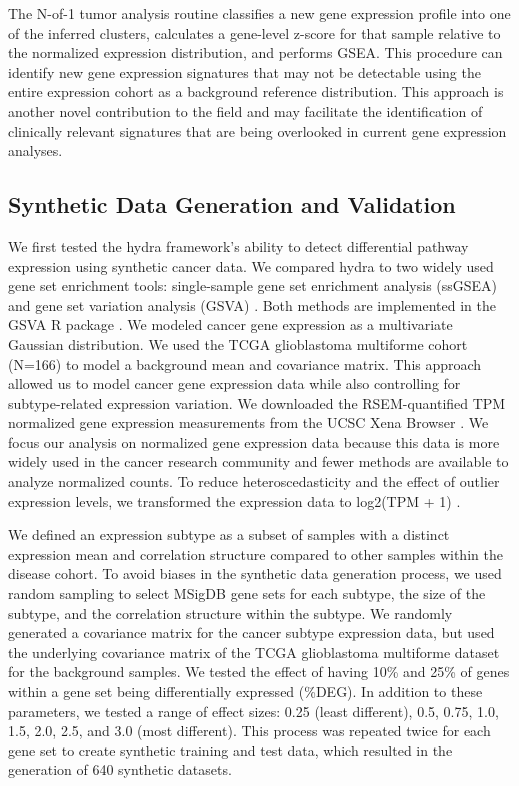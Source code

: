 \documentclass[10pt,letterpaper]{article}
\begin{document}
The N-of-1 tumor analysis routine classifies a new gene expression profile into one of the inferred clusters, calculates a gene-level z-score for that sample relative to the normalized expression distribution, and performs GSEA. This procedure can identify new gene expression signatures that may not be detectable using the entire expression cohort as a background reference distribution. This approach is another novel contribution to the field and may facilitate the identification of clinically relevant signatures that are being overlooked in current gene expression analyses.

\subsection*{Synthetic Data Generation and Validation}

We first tested the hydra framework’s ability to detect differential pathway expression using synthetic cancer data. We compared hydra to two widely used gene set enrichment tools: single-sample gene set enrichment analysis (ssGSEA) and gene set variation analysis (GSVA) \cite{barbieSystematicRNAInterference2009, hanzelmannGSVAGeneSet2013, tarcaComparisonGeneSet2013}. Both methods are implemented in the GSVA R package \cite{hanzelmannGSVAGeneSet2013}. We modeled cancer gene expression as a multivariate Gaussian distribution. We used the TCGA glioblastoma multiforme cohort (N=166) to model a background mean and covariance matrix. This approach allowed us to model cancer gene expression data while also controlling for subtype-related expression variation. We downloaded the RSEM-quantified TPM normalized gene expression measurements from the UCSC Xena Browser \cite{goldmanUCSCXenaPlatform2018}. We focus our analysis on normalized gene expression data because this data is more widely used in the cancer research community and fewer methods are available to analyze normalized counts. To reduce heteroscedasticity and the effect of outlier expression levels, we transformed the expression data to log2(TPM + 1) \cite{zwienerTransformingRNASeqData2014}. 

We defined an expression subtype as a subset of samples with a distinct expression mean and correlation structure compared to other samples within the disease cohort. To avoid biases in the synthetic data generation process, we used random sampling to select MSigDB gene sets for each subtype, the size of the subtype, and the correlation structure within the subtype. We randomly generated a covariance matrix for the cancer subtype expression data, but used the underlying covariance matrix of the TCGA glioblastoma multiforme dataset for the background samples. We tested the effect of having 10\% and 25\% of genes within a gene set being differentially expressed (\%DEG). In addition to these parameters, we tested a range of effect sizes: 0.25 (least different), 0.5, 0.75, 1.0, 1.5, 2.0, 2.5, and 3.0 (most different). This process was repeated twice for each gene set to create synthetic training and test data, which resulted in the generation of 640 synthetic datasets. 
\end{document}
